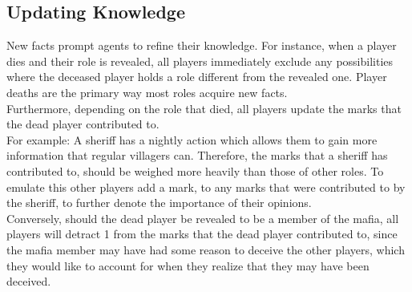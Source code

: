 \subsection{Updating Knowledge}\label{UpdatingKnowledge}
New facts prompt agents to refine their knowledge. For instance, when a player
dies and their role is revealed, all players immediately exclude any
possibilities where the deceased player holds a role different from the
revealed one. Player deaths are the primary way most roles acquire new facts.\\
Furthermore, depending on the role that died, all players update the marks that
the dead player contributed to.\\ For example: A sheriff has a nightly action
which allows them to gain more information that regular villagers can.
Therefore, the marks that a sheriff has contributed to, should be weighed more
heavily than those of other roles. To emulate this other players add a mark, to
any marks that were contributed to by the sheriff, to further denote the
importance of their opinions. \\ Conversely, should the dead player be revealed
to be a member of the mafia, all players will detract 1 from the marks that the
dead player contributed to, since the mafia member may have had some reason to
deceive the other players, which they would like to account for when they
realize that they may have been deceived.
